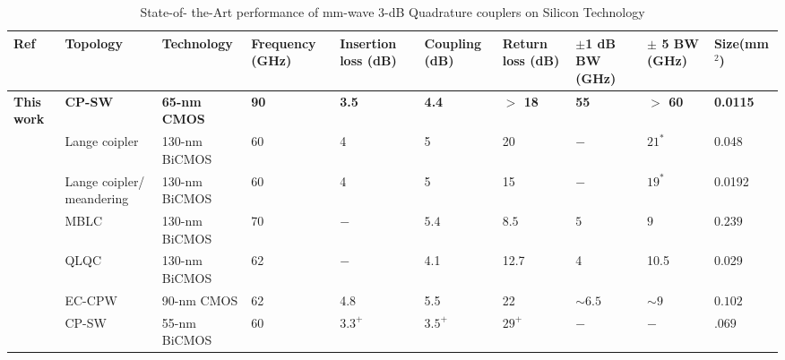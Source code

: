 \documentclass[journal]{IEEEtran}
\begin{document}
\begin{table*}
\caption{State-of- the-Art performance of mm-wave 3-dB Quadrature couplers on Silicon Technology}
\label{table:technology} %
\begin{tabular}{ |p{1.6cm}||p{1.7cm}|p{2.1cm}|p{1cm}|p{1cm}|p{1cm}|p{1cm}|p{1cm}|p{1cm}|p{1.2cm}| }
 \hline
 Ref & Topology  & Technology & Frequency (GHz) & Insertion loss (dB) & Coupling (dB) & Return loss (dB) & $\pm$1 dB BW (GHz) & $\pm$ 5 BW (GHz) & Size(mm$^2$) \\ %
 \hline
  \textbf{This work} & \textbf{CP-SW}  & \textbf{65-nm CMOS} & \textbf{90} & \textbf{3.5}  &  \textbf{4.4} & \textbf{$>$ 18} & \textbf{55} & \textbf{$>$ 60}  & \textbf{0.0115}\\ %
 \hline
  [Floyd.IMS] & Lange coipler & 130-nm BiCMOS  & 60 & 4 & 5 & 20 & $-$ & $21^*$ & 0.048\\ %
 \hline
  [Floyd.IMS] & Lange coipler/ meandering & 130-nm BiCMOS  & 60 & 4 & 5 & 15 & $-$ & $19^*$ & 0.0192\\ %
 \hline
  [D.Titz] & MBLC & 130-nm BiCMOS  & 70 & $-$ & $5.4$ & $8.5$ & $5$ & $9$ & $0.239$\\ %
 \hline
  [D.Titz] & QLQC & 130-nm BiCMOS  & 62 & $-$ & 4.1 & 12.7 & 4 & 10.5 & 0.029\\ %
 \hline
  [EC.CPW] & EC-CPW & 90-nm CMOS  & 62 & 4.8 & 5.5 & 22 & $\sim 6.5$ & $\sim 9$ & $0.102$\\ %
 \hline
  [Ferrari.Thesis] & CP-SW & 55-nm BiCMOS  & 60 & $3.3^+$ & $3.5^+$ & $29^+$ & $-$ & $-$ & $.069$\\ %
 \hline
\end{tabular}
\end{table*}
\end{document}
